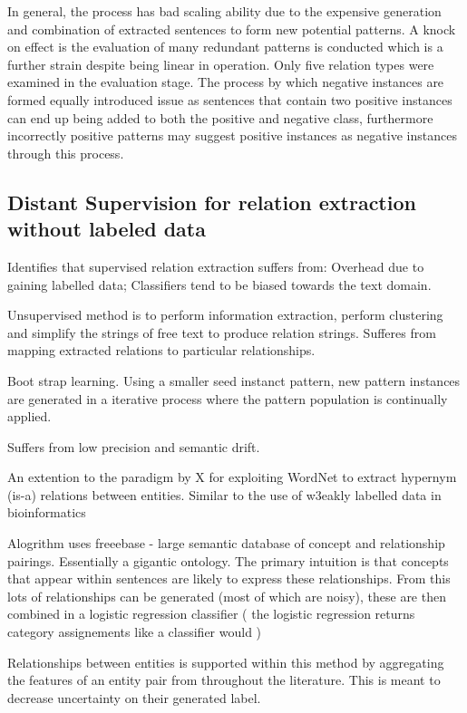 \documentclass{ecmm427_assignment}
\begin{document}
In general, the process has bad scaling ability due to the expensive generation and combination of extracted sentences to form new potential patterns. A knock on effect is the evaluation of many redundant patterns is conducted which is a further strain despite being linear in operation. Only five relation types were examined in the evaluation stage. The process by which negative instances are formed equally introduced issue as sentences that contain two positive instances can end up being added to both the positive and negative class, furthermore incorrectly positive patterns may suggest positive instances as negative instances through this process.

\subsection{Distant Supervision for relation extraction without labeled data}

Identifies \cite{supervisedDistant} that supervised relation extraction suffers from: Overhead due to gaining labelled data; Classifiers tend to be biased towards the text domain.

Unsupervised method is to perform information extraction, perform clustering and simplify the strings of free text to produce relation strings. Sufferes from mapping extracted relations to particular relationships.

Boot strap learning. Using a smaller seed instanct pattern, new pattern instances are generated in a iterative process where the pattern population is continually applied.

Suffers from low precision and semantic drift.

An extention to the paradigm by X for exploiting WordNet to extract hypernym (is-a) relations between entities. Similar to the use of w3eakly labelled data in bioinformatics 

Alogrithm uses freeebase - large semantic database of concept and relationship pairings. Essentially a gigantic ontology. The primary intuition is that concepts that appear within sentences are likely to express these relationships. From this lots of relationships can be generated (most of which are noisy), these are then combined in a logistic regression classifier ( the logistic regression returns category assignements like a classifier would )

Relationships between entities is supported within this method by aggregating the features of an entity pair from throughout the literature. This is meant to decrease uncertainty on their generated label.
\end{document}

